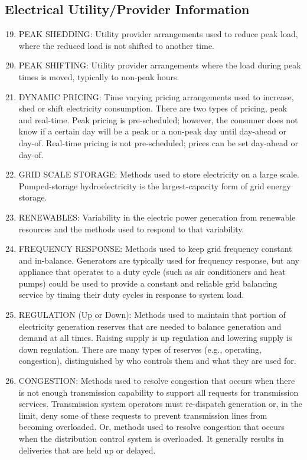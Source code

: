 \subsection*{Electrical Utility/Provider Information}

\begin{enumerate} [nosep]
\setcounter{enumi}{18}
\item
PEAK SHEDDING: Utility provider arrangements used to reduce peak load, where the reduced 
load is not shifted to another time.

\item
PEAK SHIFTING: Utility provider arrangements where the load during peak times is moved, 
typically to non-peak hours.

\item
DYNAMIC PRICING: Time varying pricing arrangements used to increase, shed or shift 
electricity consumption. There are two types of pricing, peak and real-time. 
Peak pricing is pre-scheduled; however, the consumer does not know if a certain day will be 
a peak or a non-peak day until day-ahead or day-of. Real-time pricing is not pre-scheduled; 
prices can be set day-ahead or day-of.

\item
GRID SCALE STORAGE: Methods used to store electricity on a large scale. Pumped-storage 
hydroelectricity is the largest-capacity form of grid energy storage.

\item
RENEWABLES: Variability in the electric power generation from renewable resources and 
the methods used to respond to that variability.

\item
FREQUENCY RESPONSE: Methods used to keep grid frequency constant and in-balance. 
Generators are typically used for frequency response, but any appliance that operates to 
a duty cycle (such as air conditioners and heat pumps) could be used to provide a constant 
and reliable grid balancing service by timing their duty cycles in response to system load. 

\item
REGULATION (Up or Down): Methods used to maintain that portion of electricity generation 
reserves that are needed to balance generation and demand at all times. Raising supply is 
up regulation and lowering supply is down regulation. There are many types of 
reserves (e.g., operating, congestion), distinguished by who controls them and what they are used for.

\item
CONGESTION: Methods used to resolve congestion that occurs when there is not enough 
transmission capability to support all requests for transmission services. Transmission 
system operators must re-dispatch generation or, in the limit, deny some of these 
requests to prevent transmission lines from becoming overloaded. Or, methods used to resolve 
congestion that occurs when the distribution control system is overloaded. It generally 
results in deliveries that are held up or delayed. 


\end{enumerate}
